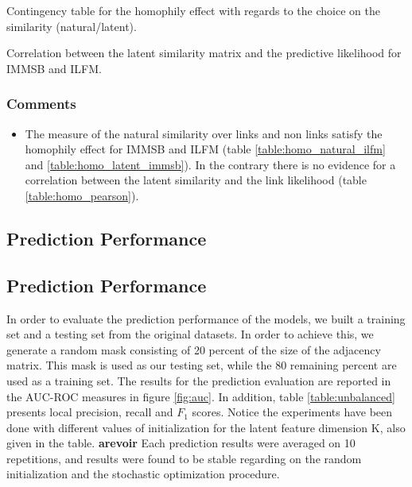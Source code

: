 \documentclass[a4paper, 12pt]{article}
\newcommand*{\lpath}{../}%
\begin{document}
\begin{table}
    \caption{Contingency table for the homophily effect with regards to the choice on the similarity (natural/latent).}
\centering


    \label{table:homo_contingency}
\end{table}

\begin{table}[h]
    \caption{Correlation between the latent similarity matrix and the predictive likelihood for IMMSB and ILFM.}
    \centering
    
    \label{table:homo_pearson}
\end{table}


\subsubsection{Comments}
\begin{itemize}
    \item The measure of the natural similarity over links and non links satisfy the homophily effect for IMMSB and ILFM (table \ref{table:homo_natural_ilfm} and \ref{table:homo_latent_immsb}). In the contrary there is no evidence for a correlation between the latent similarity and the link likelihood (table \ref{table:homo_pearson}). 
\end{itemize}


\subsection{Prediction Performance}
\subsection{Prediction Performance}
In order to evaluate the  prediction performance of the models, we built a training set and a testing set from the original datasets. In order to achieve this, we generate a random mask consisting of 20 percent of the size of the adjacency matrix. This mask is used as our testing set, while the 80 remaining percent are used as a training set. The results for the prediction evaluation are reported in  the AUC-ROC measures in figure \ref{fig:auc}. In addition,  table \ref{table:unbalanced} presents local precision, recall and $F_1$ scores.   Notice the experiments have been done with different  values of initialization for the latent feature dimension K, also given in the table.
\textbf{arevoir}
Each prediction results were averaged on 10 repetitions, and results were found to be stable regarding on the random  initialization and the stochastic optimization procedure. 
\end{document}

